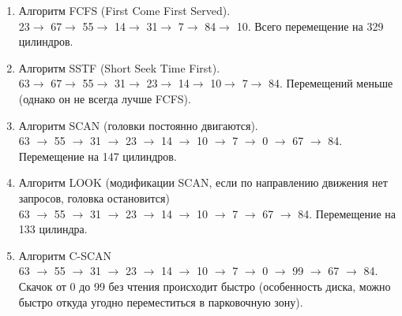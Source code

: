 \documentclass[12pt, a4paper]{article}
\begin{document}
    \begin{enumerate}
        \item Алгоритм FCFS (First Come First Served).\\
        23$\to$ 67$\to$ 55$\to$ 14$\to$ 31$\to$ 7$\to$ 84$\to$ 10. Всего перемещение на 329 цилиндров.
        \item Алгоритм SSTF (Short Seek Time First).\\
        63$\to$ 67$\to$ 55$\to$ 31$\to$ 23$\to$ 14$\to$ 10$\to$ 7$\to$ 84. Перемещений меньше (однако он не всегда лучше FCFS).
        \item Алгоритм SCAN (головки постоянно двигаются).\\
        63 $\to$ 55 $\to$ 31 $\to$ 23 $\to$ 14 $\to$ 10 $\to$ 7 $\to$ 0 $\to$ 67 $\to$ 84. Перемещение на 147 цилиндров.
        \item Алгоритм LOOK (модификации SCAN, если по направлению движения нет запросов, головка остановится)\\
        63 $\to$ 55 $\to$ 31 $\to$ 23 $\to$ 14 $\to$ 10 $\to$ 7 $\to$ 67 $\to$ 84. Перемещение на 133 цилиндра.
        \item Алгоритм C-SCAN\\
        63 $\to$ 55 $\to$ 31 $\to$ 23 $\to$ 14 $\to$ 10 $\to$ 7 $\to$ 0 $\to$ 99 $\to$ 67 $\to$ 84. Скачок от 0 до 99 без чтения происходит быстро (особенность диска, можно быстро откуда угодно переместиться в парковочную зону).
    \end{enumerate}
\end{document}
